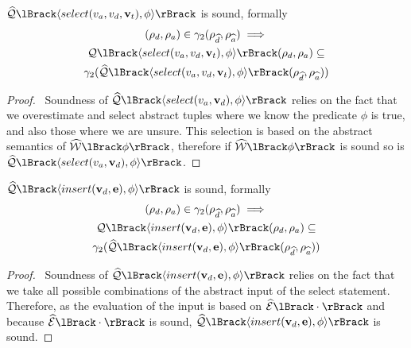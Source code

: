 \begin{conjecture}
    \label{thm:sound-select}
    $\abssqlsem{\langle select(v_a, v_d, \mathbf{v}_t), \phi \rangle}$ is sound, formally
    \begin{multline*}
    (\rho_d, \rho_a)
        \in \concrete_2(\rho_{\ab{d}}, \rho_{\ab{a}}) \implies \\
        \sqlsem{\langle select(v_a, v_d, \mathbf{v}_t), \phi \rangle}(\rho_d, \rho_a) \subseteq \\
        \concrete_2(\abssqlsem{\langle select(v_a, v_d, \mathbf{v}_t), \phi \rangle}(\rho_{\ab{d}}, \rho_{\ab{a}}))
    \end{multline*}
\end{conjecture}


\begin{proof}
    \pfsketch\
    Soundness of $\abssqlsem{\langle select(v_a, \mathbf{v}_d), \phi \rangle}$ relies on the fact that we overestimate and select abstract tuples where we know the predicate $\phi$ is true, and also those where we are unsure.
    This selection is based on the abstract semantics of $\abspredsem{\phi}$, therefore if $\abspredsem{\phi}$ is sound so is $\abssqlsem{\langle select(v_a, \mathbf{v}_d), \phi \rangle}$.
\end{proof}


\begin{conjecture}
    \label{thm:sound-insert}
    $\abssqlsem{\langle insert(\mathbf{v}_d, \mathbf{e}), \phi \rangle}$ is sound, formally
    \begin{multline*}
    (\rho_d, \rho_a)
        \in \concrete_2(\rho_{\ab{d}}, \rho_{\ab{a}}) \implies \\
        \sqlsem{\langle insert(\mathbf{v}_d, \mathbf{e}), \phi \rangle}(\rho_d, \rho_a) \subseteq \\
        \concrete_2(\abssqlsem{\langle insert(\mathbf{v}_d, \mathbf{e}), \phi \rangle}(\rho_{\ab{d}}, \rho_{\ab{a}}))
    \end{multline*}

\end{conjecture}


\begin{proof}
    \pfsketch\
    Soundness of $\abssqlsem{\langle insert(\mathbf{v}_d, \mathbf{e}), \phi \rangle}$ relies on the fact that we take all possible combinations of the abstract input of the select statement.
    Therefore, as the evaluation of the input is based on $\absexpsem{\cdot}$ and because $\absexpsem{\cdot}$ is sound, $\abssqlsem{\langle insert(\mathbf{v}_d, \mathbf{e}), \phi \rangle}$ is sound.
\end{proof}


